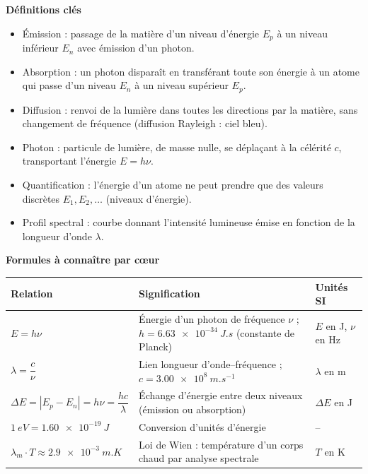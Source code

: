 \documentclass[11pt]{article}
\newcommand{\cle}[1]{{\popxbold\color{popdark}#1}}
\begin{document}
\begin{bilan}
\textbf{D\'efinitions cl\'es}
\begin{itemize}
  \item \cle{\'Emission} : passage de la mati\`ere d'un niveau d'\'energie $E_p$ \`a un niveau inf\'erieur $E_n$ avec \'emission d'un photon.
  \item \cle{Absorption} : un photon dispara\^it en transf\'erant toute son \'energie \`a un atome qui passe d'un niveau $E_n$ \`a un niveau sup\'erieur $E_p$.
  \item \cle{Diffusion} : renvoi de la lumi\`ere dans toutes les directions par la mati\`ere, sans changement de fr\'equence (diffusion Rayleigh : ciel bleu).
  \item \cle{Photon} : particule de lumi\`ere, de masse nulle, se d\'epla\c{c}ant \`a la c\'el\'erit\'e $c$, transportant l'\'energie $E=h\nu$.
  \item \cle{Quantification} : l'\'energie d'un atome ne peut prendre que des valeurs discr\`etes $E_1, E_2, \dots$ (niveaux d'\'energie).
  \item \cle{Profil spectral} : courbe donnant l'intensit\'e lumineuse \'emise en fonction de la longueur d'onde $\lambda$.
\end{itemize}

\textbf{Formules \`a conna\^itre par c\oe ur}
\begin{center}
\begin{tabularx}{\linewidth}{|l|X|l|}\hline
\rowcolor{popblueL}
\textbf{Relation} & \textbf{Signification} & \textbf{Unit\'es SI} \\ \hline
$E = h\nu$ & \'Energie d'un photon de fr\'equence $\nu$ ; $h=\SI{6,63e-34}{J.s}$ (constante de Planck) & $E$ en J, $\nu$ en Hz \\ \hline
$\lambda = \dfrac{c}{\nu}$ & Lien longueur d'onde--fr\'equence ; $c=\SI{3,00e8}{m.s^{-1}}$ & $\lambda$ en m \\ \hline
$\Delta E = |E_p - E_n| = h\nu = \dfrac{hc}{\lambda}$ & \'Echange d'\'energie entre deux niveaux (\'emission ou absorption) & $\Delta E$ en J \\ \hline
$\SI{1}{eV} = \SI{1,60e-19}{J}$ & Conversion d'unit\'es d'\'energie & -- \\ \hline
$\lambda_m \cdot T \approx \SI{2,9e-3}{m.K}$ & Loi de Wien : temp\'erature d'un corps chaud par analyse spectrale & $T$ en K \\ \hline
\end{tabularx}
\end{center}


\end{bilan}
\end{document}
